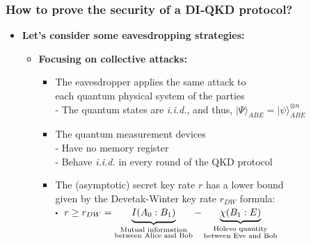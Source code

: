 \documentclass{beamer}
\newcommand\sbullet[1][.5]{\mathbin{\vcenter{\hbox{\scalebox{#1}{$\bullet$}}}}}
\begin{document}
    \begin{frame}
        \frametitle{\large How to prove the security of a DI‑QKD protocol?}

        \vspace{3ex}
        \begin{itemize}
            \item \textbf{Let's consider some eavesdropping strategies:}
            \begin{itemize}
                \item \textbf{Focusing on collective attacks:}
                \begin{itemize}
                    \item The eavesdropper applies the same attack to\\ each quantum physical system of the parties\\
                    - The quantum states are \textit{i.i.d.}, and thus, ${|\Psi\rangle}_{ABE} = {|\psi\rangle}_{ABE}^{\otimes n}$
                    \vspace{1ex}
                    \item The quantum measurement devices\\
                    - Have no memory register\\
                    - Behave \textit{i.i.d.} in every round of the QKD protocol
                    \vspace{2ex}
                    \item The (asymptotic) secret key rate $r$ has a lower bound\\ given by the Devetak-Winter key rate ${r}_{DW}$ formula:\\
                    $\sbullet$\, $r \geq {r}_{DW} = \underbrace{\strut I({A}_{0}:{B}_{1})}_{\substack{\text{Mutual information}\\ \text{between Alice and Bob}}} - \underbrace{\chi({B}_{1}:E)}_{\substack{\text{Holevo quantity}\\ \text{between Eve and Bob}}} $
                 \end{itemize}
            \end{itemize}
        \end{itemize}
    \end{frame}
\end{document}
